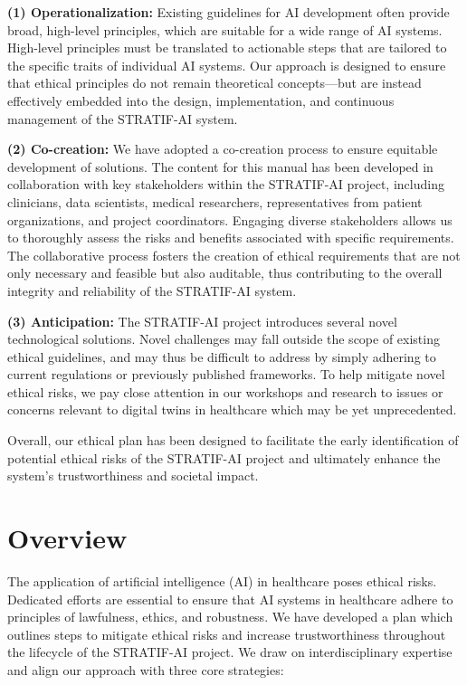 \documentclass[
  letterpaper,
  DIV=11,
  numbers=noendperiod]{scrreport}
\begin{document}
\textbf{(1) Operationalization:} Existing guidelines for AI development
often provide broad, high-level principles, which are suitable for a
wide range of AI systems. High-level principles must be translated to
actionable steps that are tailored to the specific traits of individual
AI systems. Our approach is designed to ensure that ethical principles
do not remain theoretical concepts---but are instead effectively
embedded into the design, implementation, and continuous management of
the STRATIF-AI system.

\textbf{(2) Co-creation:} We have adopted a co-creation process to
ensure equitable development of solutions. The content for this manual
has been developed in collaboration with key stakeholders within the
STRATIF-AI project, including clinicians, data scientists, medical
researchers, representatives from patient organizations, and project
coordinators. Engaging diverse stakeholders allows us to thoroughly
assess the risks and benefits associated with specific requirements. The
collaborative process fosters the creation of ethical requirements that
are not only necessary and feasible but also auditable, thus
contributing to the overall integrity and reliability of the STRATIF-AI
system.

\textbf{(3) Anticipation:} The STRATIF-AI project introduces several
novel technological solutions. Novel challenges may fall outside the
scope of existing ethical guidelines, and may thus be difficult to
address by simply adhering to current regulations or previously
published frameworks. To help mitigate novel ethical risks, we pay close
attention in our workshops and research to issues or concerns relevant
to digital twins in healthcare which may be yet unprecedented.

Overall, our ethical plan has been designed to facilitate the early
identification of potential ethical risks of the STRATIF-AI project and
ultimately enhance the system's trustworthiness and societal impact.


\hypertarget{overview-1}{%
\chapter*{Overview}\label{overview-1}}


The application of artificial intelligence (AI) in healthcare poses
ethical risks. Dedicated efforts are essential to ensure that AI systems
in healthcare adhere to principles of lawfulness, ethics, and
robustness. We have developed a plan which outlines steps to mitigate
ethical risks and increase trustworthiness throughout the lifecycle of
the STRATIF-AI project. We draw on interdisciplinary expertise and align
our approach with three core strategies:
\end{document}
